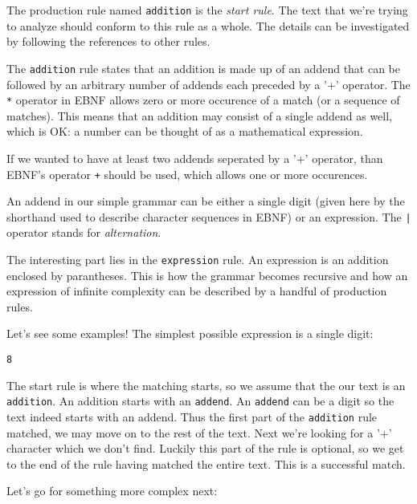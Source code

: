 \documentclass[12pt]{article}
\begin{document}
The production rule named \texttt{addition} is the \emph{start rule}. The text that we're trying to analyze
should conform to this rule as a whole. The details can be investigated by following the references to other
rules.

The \texttt{addition} rule states that an addition is made up of an addend that can be followed by an
arbitrary number of addends each preceded by a '+' operator. The \texttt{*} operator in EBNF allows zero or
more occurence of a match (or a sequence of matches). This means that an addition may consist of a single
addend as well, which is OK: a number can be thought of as a mathematical expression.

If we wanted to have at least two addends seperated by a '+' operator, than EBNF's operator \texttt{+} should
be used, which allows one or more occurences.

An addend in our simple grammar can be either a single digit (given here by the shorthand used to describe
character sequences in EBNF) or an expression. The \texttt{|} operator stands for \emph{alternation}.

The interesting part lies in the \texttt{expression} rule. An expression is an addition enclosed by
parantheses. This is how the grammar becomes recursive and how an expression of infinite complexity can be
described by a handful of production rules.

Let's see some examples! The simplest possible expression is a single digit:

\begin{center}
	\begin{minipage}[h]{0.1\textwidth}
		\begin{lstlisting}[breaklines=true]
8
		\end{lstlisting}
	\end{minipage}
\end{center}

The start rule is where the matching starts, so we assume that the our text is an \texttt{addition}. An addition starts
with an \texttt{addend}. An \texttt{addend} can be a digit so the text indeed starts with an addend. Thus the
first part of the \texttt{addition} rule matched, we may move on to the rest of the text. Next we're looking
for a '+' character which we don't find. Luckily this part of the rule is optional, so we get to the end of
the rule having matched the entire text. This is a successful match.

Let's go for something more complex next:
\end{document}

